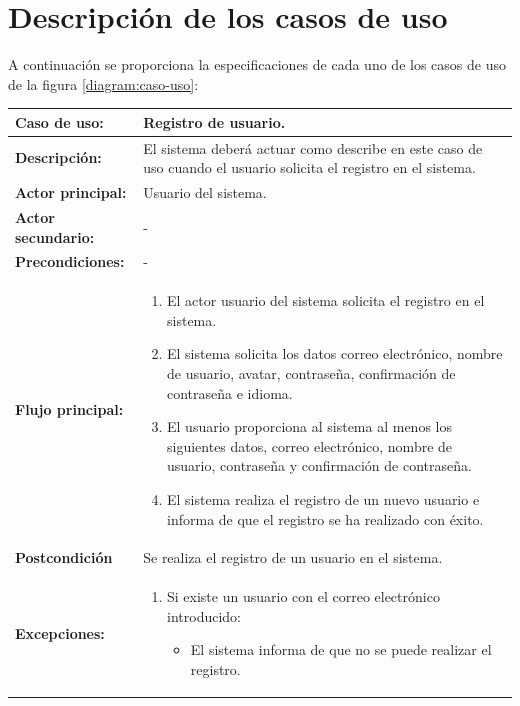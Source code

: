 \section{Descripción de los casos de uso}
\label{sec:especificaciones-caso-uso}

A continuación se proporciona la especificaciones de cada uno de los casos de uso de la figura \ref{diagram:caso-uso}:


\begin{table}[H]
  \begin{center}
    \begin{tabular}{|p{3.5cm}|p{10cm}|}
      \hline
      {\textbf{Caso de uso:}} & { Registro de usuario.} \\
      \hline
      {\textbf{Descripción:}} & { El sistema deberá actuar como describe en este caso de uso cuando el usuario solicita el registro en el sistema.} \\
     \hline
      {\textbf{Actor principal:}} & { Usuario del sistema.} \\
      \hline
      {\textbf{Actor secundario:}} & { - } \\
      \hline
      {\textbf{Precondiciones:}} & { - } \\
     \hline   
    {\textbf{Flujo principal:}} & { 
      \begin{enumerate}
	\item El actor usuario del sistema solicita el registro en el sistema.
	\item El sistema solicita los datos correo electrónico, nombre de usuario, avatar, contraseña, confirmación de contraseña e idioma.
	\item El usuario proporciona al sistema al menos los siguientes datos, correo electrónico, nombre de usuario, contraseña y confirmación de contraseña.
	\item El sistema realiza el registro de un nuevo usuario e informa de que el registro se ha realizado con éxito.
      \end{enumerate}
      } \\
     \hline
     {\textbf{Postcondición}} & {Se realiza el registro de un usuario en el sistema.}\\
     \hline
         {\textbf{Excepciones:}} & {
         \begin{enumerate}
          \item Si existe un usuario con el correo electrónico introducido:
          \begin{itemize}
           \item El sistema informa de que no se puede realizar el registro.

\end{itemize}
\end{enumerate}}
\end{tabular}
\end{center}
\end{table}
